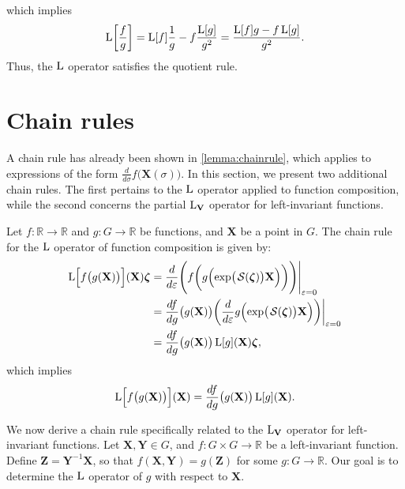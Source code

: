 which implies
\begin{align}
    \operatorname{L}\biggl[\frac{f}{g}\biggr] = \operatorname{L}[f]\frac{1}{g} - f\frac{\operatorname{L}[g]}{g^2} = \frac{\operatorname{L}[f]g - f\operatorname{L}[g]}{g^2}.
\end{align}
Thus, the $\operatorname{L}$ operator satisfies the quotient rule.
\section{Chain rules}
A chain rule has already been shown in \cref{lemma:chainrule}, which applies to expressions of the form $\frac{d}{d\sigma}f\bigl(\mathbf{X}(\sigma)\bigr)$. In this section, we present two additional chain rules. The first pertains to the $\operatorname{L}$ operator applied to function composition, while the second concerns the partial $\operatorname{L}_\mathbf{V}$ operator for left-invariant functions.

Let $f:\mathbb{R}\to\mathbb{R}$ and $g:G\to \mathbb{R}$ be functions, and $\mathbf{X}$ be a point in $G$. The chain rule for the $\operatorname{L}$ operator of function composition is given by:
\begin{align}
    \Lop\Bigl[f\bigl(g(\mathbf{X})\bigr)\Bigr](\mathbf{X})\boldsymbol{\zeta} &= \frac{d}{d\varepsilon}\Biggl(f\biggl(g\Bigl(\exp\bigl(\SL[\boldsymbol{\zeta}]\bigr)\mathbf{X}\Bigr)\biggr)\Biggr)\Biggr|_{\varepsilon=0}\\
    &= \frac{df}{dg}\bigl(g(\mathbf{X})\bigr)\biggl(\frac{d}{d\varepsilon}g\Bigl(\exp\bigl(\SL[\boldsymbol{\zeta}]\bigr)\mathbf{X}\Bigr)\biggr)\biggr|_{\varepsilon=0}\\
    &= \frac{df}{dg}\bigl(g(\mathbf{X})\bigr)\Lop[g](\mathbf{X})\boldsymbol{\zeta},
\end{align}
which implies
\begin{align}
    \operatorname{L}\Bigl[f\bigl(g(\mathbf{X})\bigr)\Bigr](\mathbf{X}) = \frac{df}{dg}\bigl(g(\mathbf{X})\bigr)\operatorname{L}[g](\mathbf{X}).
\end{align}

We now derive a chain rule specifically related to the $\operatorname{L}_\mathbf{V}$ operator for left-invariant functions. Let $\mathbf{X},\mathbf{Y}\in G$, and $f : G \times G \to \mathbb{R}$ be a left-invariant function. Define $\mathbf{Z} = \mathbf{Y}^{-1}\mathbf{X}$, so that $f(\mathbf{X},\mathbf{Y}) = g(\mathbf{Z})$ for some $g:G\to\mathbb{R}$. Our goal is to determine the $\operatorname{L}$ operator of $g$ with respect to $\mathbf{X}$. 

